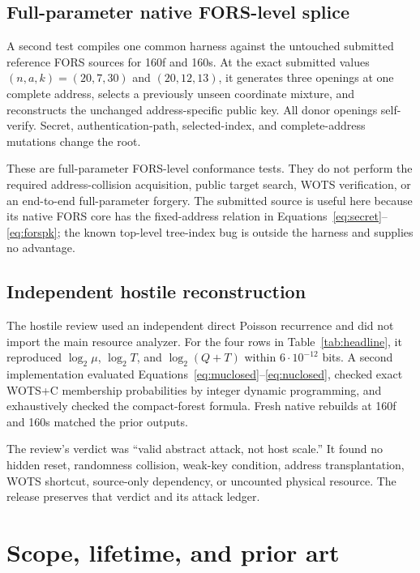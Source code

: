 \documentclass[11pt,a4paper]{article}
\begin{document}
\subsection{Full-parameter native FORS-level splice}

A second test compiles one common harness against the untouched submitted
reference FORS sources for 160f and 160s.  At the exact submitted values
$(n,a,k)=(20,7,30)$ and $(20,12,13)$, it generates three openings at one
complete address, selects a previously unseen coordinate mixture, and
reconstructs the unchanged address-specific public key.  All donor openings
self-verify.  Secret, authentication-path, selected-index, and complete-address
mutations change the root.

These are full-parameter FORS-level conformance tests.  They do not perform
the required address-collision acquisition, public target search, WOTS
verification, or an end-to-end full-parameter forgery.  The submitted source
is useful here because its native FORS core has the fixed-address relation in
Equations~\eqref{eq:secret}--\eqref{eq:forspk}; the known top-level tree-index
bug is outside the harness and supplies no advantage.

\subsection{Independent hostile reconstruction}

The hostile review used an independent direct Poisson recurrence and did not
import the main resource analyzer.  For the four rows in
Table~\ref{tab:headline}, it reproduced $\log_2\mu$, $\log_2T$, and
$\log_2(Q+T)$ within $6\cdot10^{-12}$ bits.  A second implementation evaluated
Equations~\eqref{eq:muclosed}--\eqref{eq:nuclosed}, checked exact WOTS+C
membership probabilities by integer dynamic programming, and exhaustively
checked the compact-forest formula.  Fresh native rebuilds at 160f and 160s
matched the prior outputs.

The review's verdict was ``valid abstract attack, not host scale.''  It found
no hidden reset, randomness collision, weak-key condition, address
transplantation, WOTS shortcut, source-only dependency, or uncounted physical
resource.  The release preserves that verdict and its attack ledger.

\section{Scope, lifetime, and prior art}
\end{document}
